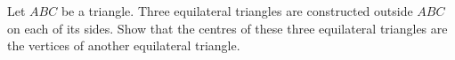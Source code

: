 Let $ABC$ be a triangle. Three equilateral triangles are constructed outside $ABC$ on each of its sides. Show that the centres of these three equilateral triangles are the vertices of another equilateral triangle.
